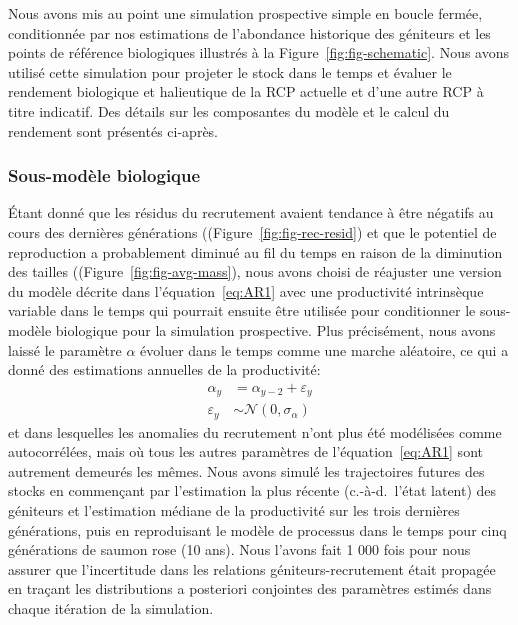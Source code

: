 \documentclass[french,11pt]{book}
\begin{document}
Nous avons mis au point une simulation prospective simple en boucle fermée, conditionnée par nos estimations de l'abondance historique des géniteurs et les points de référence biologiques illustrés à la Figure~\ref{fig:fig-schematic}. Nous avons utilisé cette simulation pour projeter le stock dans le temps et évaluer le rendement biologique et halieutique de la RCP actuelle et d'une autre RCP à titre indicatif. Des détails sur les composantes du modèle et le calcul du rendement sont présentés ci-après.

\hypertarget{sous-moduxe8le-biologique}{%
\subsubsection{Sous-modèle biologique}\label{sous-moduxe8le-biologique}}

Étant donné que les résidus du recrutement avaient tendance à être négatifs au cours des dernières générations ((Figure~\ref{fig:fig-rec-resid}) et que le potentiel de reproduction a probablement diminué au fil du temps en raison de la diminution des tailles ((Figure~\ref{fig:fig-avg-mass}), nous avons choisi de réajuster une version du modèle décrite dans l'équation~\ref{eq:AR1} avec une productivité intrinsèque variable dans le temps qui pourrait ensuite être utilisée pour conditionner le sous-modèle biologique pour la simulation prospective. Plus précisément, nous avons laissé le paramètre \(\alpha\) évoluer dans le temps comme une marche aléatoire, ce qui a donné des estimations annuelles de la productivité:
\begin{equation}
\begin{aligned}
\alpha_y &= \alpha_{y-2} + \varepsilon_y \\
\varepsilon_y &\sim \mathcal{N}(0, \sigma_\alpha)
\end{aligned}
\label{eq:tv-alpha}
\end{equation}
et dans lesquelles les anomalies du recrutement n'ont plus été modélisées comme autocorrélées, mais où tous les autres paramètres de l'équation~\ref{eq:AR1} sont autrement demeurés les mêmes. Nous avons simulé les trajectoires futures des stocks en commençant par l'estimation la plus récente (c.-à-d.~l'état latent) des géniteurs et l'estimation médiane de la productivité sur les trois dernières générations, puis en reproduisant le modèle de processus dans le temps pour cinq générations de saumon rose (10 ans). Nous l'avons fait 1 000 fois pour nous assurer que l'incertitude dans les relations géniteurs-recrutement était propagée en traçant les distributions a posteriori conjointes des paramètres estimés dans chaque itération de la simulation.
\end{document}
